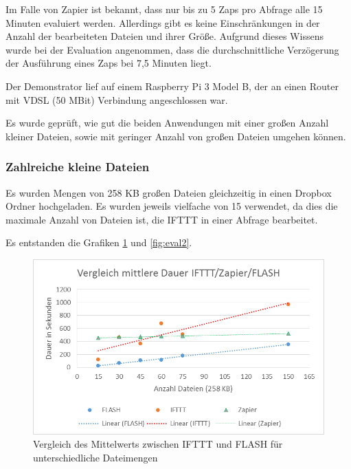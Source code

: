 Im Falle von Zapier ist bekannt, dass nur bis zu 5 Zaps pro Abfrage alle 15 Minuten evaluiert werden. Allerdings gibt es keine Einschränkungen in der Anzahl der bearbeiteten Dateien und ihrer Größe. Aufgrund dieses Wissens wurde bei der Evaluation angenommen, dass die durchschnittliche Verzögerung der Ausführung eines Zaps bei 7,5 Minuten liegt.

Der Demonstrator lief auf einem Raspberry Pi 3 Model B, der an einen Router mit VDSL (50 MBit) Verbindung angeschlossen war.

Es wurde geprüft, wie gut die beiden Anwendungen mit einer großen Anzahl kleiner Dateien, sowie mit geringer Anzahl von großen Dateien umgehen können. 

\subsubsection{Zahlreiche kleine Dateien}
Es wurden Mengen von 258 KB großen Dateien gleichzeitig in einen Dropbox Ordner hochgeladen. Es wurden jeweils vielfache von 15 verwendet, da dies die maximale Anzahl von Dateien ist, die IFTTT in einer Abfrage bearbeitet.

Es entstanden die Grafiken \ref{fig:eval1} und \ref{fig:eval2}.
\begin{figure}
	\centering
	\includegraphics[width=\textwidth]{bilder/vs_mittelwert2}
	\caption{Vergleich des Mittelwerts zwischen IFTTT und FLASH für unterschiedliche Dateimengen}
	\label{fig:eval1}
\end{figure}

